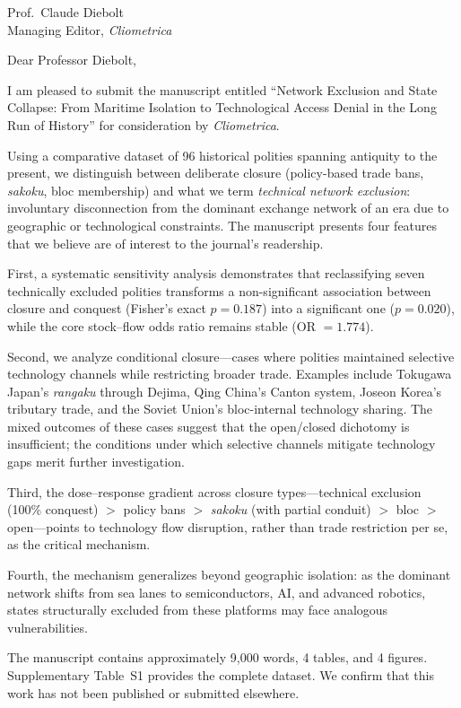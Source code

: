 \documentclass[11pt]{letter}
\begin{document}
\begin{letter}{Prof.\ Claude Diebolt\\Managing Editor, \emph{Cliometrica}}
\opening{Dear Professor Diebolt,}

I am pleased to submit the manuscript entitled ``Network Exclusion and State Collapse: From Maritime Isolation to Technological Access Denial in the Long Run of History'' for consideration by \emph{Cliometrica}.

Using a comparative dataset of 96 historical polities spanning antiquity to the present, we distinguish between deliberate closure (policy-based trade bans, \emph{sakoku}, bloc membership) and what we term \emph{technical network exclusion}: involuntary disconnection from the dominant exchange network of an era due to geographic or technological constraints. The manuscript presents four features that we believe are of interest to the journal's readership.

First, a systematic sensitivity analysis demonstrates that reclassifying seven technically excluded polities transforms a non-significant association between closure and conquest (Fisher's exact $p = 0.187$) into a significant one ($p = 0.020$), while the core stock--flow odds ratio remains stable (OR $= 1.774$).

Second, we analyze conditional closure---cases where polities maintained selective technology channels while restricting broader trade. Examples include Tokugawa Japan's \emph{rangaku} through Dejima, Qing China's Canton system, Joseon Korea's tributary trade, and the Soviet Union's bloc-internal technology sharing. The mixed outcomes of these cases suggest that the open/closed dichotomy is insufficient; the conditions under which selective channels mitigate technology gaps merit further investigation.

Third, the dose--response gradient across closure types---technical exclusion (100\% conquest) $>$ policy bans $>$ \emph{sakoku} (with partial conduit) $>$ bloc $>$ open---points to technology flow disruption, rather than trade restriction per se, as the critical mechanism.

Fourth, the mechanism generalizes beyond geographic isolation: as the dominant network shifts from sea lanes to semiconductors, AI, and advanced robotics, states structurally excluded from these platforms may face analogous vulnerabilities.

The manuscript contains approximately 9{,}000 words, 4 tables, and 4 figures. Supplementary Table~S1 provides the complete dataset. We confirm that this work has not been published or submitted elsewhere.


\end{letter}
\end{document}
